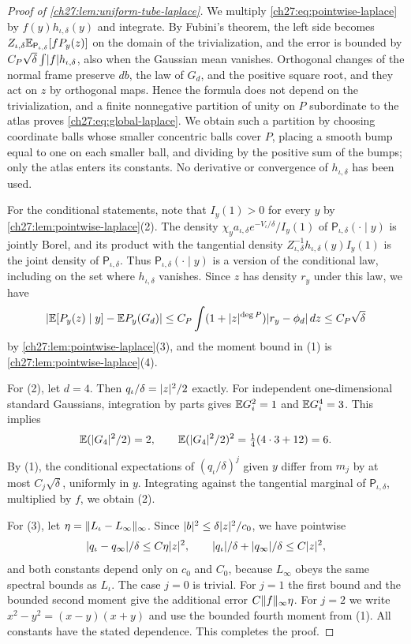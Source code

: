 \begin{proof}[Proof of \cref{ch27:lem:uniform-tube-laplace}]
We multiply \eqref{ch27:eq:pointwise-laplace} by $f(y)h_{\iota,\delta}(y)$ and integrate. By Fubini's theorem, the left side becomes $Z_{\iota,\delta}\mathbb E_{\mathsf P_{\iota,\delta}}[fP_y(z)]$ on the domain of the trivialization, and the error is bounded by $C_P\sqrt\delta\int\lvert f\rvert h_{\iota,\delta}$, also when the Gaussian mean vanishes. Orthogonal changes of the normal frame preserve $db$, the law of $G_d$, and the positive square root, and they act on $z$ by orthogonal maps. Hence the formula does not depend on the trivialization, and a finite nonnegative partition of unity on $P$ subordinate to the atlas proves \eqref{ch27:eq:global-laplace}. We obtain such a partition by choosing coordinate balls whose smaller concentric balls cover $P$, placing a smooth bump equal to one on each smaller ball, and dividing by the positive sum of the bumps; only the atlas enters its constants. No derivative or convergence of $h_{\iota,\delta}$ has been used.

For the conditional statements, note that $I_y(1)>0$ for every $y$ by \cref{ch27:lem:pointwise-laplace}(2). The density $\chi_ya_{\iota,\delta}e^{-V_\iota/\delta}/I_y(1)$ of $\mathsf P_{\iota,\delta}(\cdot\mid y)$ is jointly Borel, and its product with the tangential density $Z_{\iota,\delta}^{-1}h_{\iota,\delta}(y)I_y(1)$ is the joint density of $\mathsf P_{\iota,\delta}$. Thus $\mathsf P_{\iota,\delta}(\cdot\mid y)$ is a version of the conditional law, including on the set where $h_{\iota,\delta}$ vanishes. Since $z$ has density $r_y$ under this law, we have
\[
 \lvert \mathbb E[P_y(z)\mid y]-\mathbb E P_y(G_d)\rvert\le C_P\int(1+\lvert z\rvert^{\deg P})\lvert r_y-\phi_d\rvert\,dz\le C_P\sqrt\delta
\]
by \cref{ch27:lem:pointwise-laplace}(3), and the moment bound in (1) is \cref{ch27:lem:pointwise-laplace}(4).

For (2), let $d=4$. Then $q_\iota/\delta=\lvert z\rvert^2/2$ exactly. For independent one-dimensional standard Gaussians, integration by parts gives $\mathbb E G_i^2=1$ and $\mathbb E G_i^4=3$. This implies
\[
 \mathbb E(\lvert G_4\rvert^2/2)=2,\qquad\mathbb E(\lvert G_4\rvert^2/2)^2=\tfrac14(4\cdot3+12)=6.
\]
By (1), the conditional expectations of $(q_\iota/\delta)^j$ given $y$ differ from $m_j$ by at most $C_j\sqrt\delta$, uniformly in $y$. Integrating against the tangential marginal of $\mathsf P_{\iota,\delta}$, multiplied by $f$, we obtain (2).

For (3), let $\eta=\lVert L_\iota-L_\infty\rVert_\infty$. Since $\lvert b\rvert^2\le\delta\lvert z\rvert^2/c_0$, we have pointwise
\[
 \lvert q_\iota-q_\infty\rvert/\delta\le C\eta\lvert z\rvert^2,\qquad\lvert q_\iota\rvert/\delta+\lvert q_\infty\rvert/\delta\le C\lvert z\rvert^2,
\]
and both constants depend only on $c_0$ and $C_0$, because $L_\infty$ obeys the same spectral bounds as $L_\iota$. The case $j=0$ is trivial. For $j=1$ the first bound and the bounded second moment give the additional error $C\lVert f\rVert_\infty\eta$. For $j=2$ we write $x^2-y^2=(x-y)(x+y)$ and use the bounded fourth moment from (1). All constants have the stated dependence. This completes the proof.
\end{proof}

